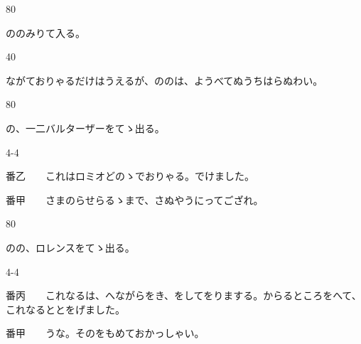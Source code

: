 \documentclass[tate,paper=b6j,jafontsize=9pt]{jlreq}
\begin{document}
\begin{azconvIndented}{8\zw}{0\zw}

ののみりて入る。

\end{azconvIndented}
\begin{azconvIndented}{4\zw}{0\zw}

ながておりゃるだけはうえるが、ののは、ようべてぬうちはらぬわい。

\end{azconvIndented}
\begin{azconvIndented}{8\zw}{0\zw}

の、一二バルターザーをてゝ出る。

\end{azconvIndented}
\begin{azconvIndented}{4\zw}{-4\zw}

番乙　　これはロミオどのゝでおりゃる。でけました。

番甲　　さまのらせらるゝまで、さぬやうにってござれ。

\end{azconvIndented}
\begin{azconvIndented}{8\zw}{0\zw}

のの、ロレンスをてゝ出る。

\end{azconvIndented}
\begin{azconvIndented}{4\zw}{-4\zw}

番丙　　これなるは、へながらをき、をしてをりまする。からるところをへて、これなるととをげました。

番甲　　うな。そのをもめておかっしゃい。

\end{azconvIndented}
\end{document}
